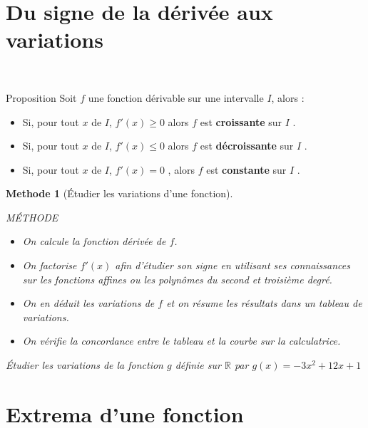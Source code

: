 \documentclass[10pt,a4paper]{article}
\def\R{{\mathbb R}}
\theoremstyle{break}
\newtheorem{Meth}{Methode}
\begin{document}
\section{Du signe de la dérivée aux variations}
~\\
\begin{bclogo}[couleur = yellow!30, arrondi = 0.1,logo=\bcbook]{Proposition}
	Soit $f$ une fonction dérivable sur une intervalle  $I$, alors :
		\begin{itemize}
		\item Si, pour tout $x$ de $I$, $f'(x)  \geq 0 $  alors $f$ est \textbf{ croissante} sur $I$ .
		\item Si, pour tout $x$ de $I$, $f'(x) \leq 0 $  alors $f$ est \textbf{ décroissante} sur $I$ .
		\item Si, pour tout $x$ de $I$, $f'(x) = 0 $ , alors $f$ est \textbf{ constante } sur $I$ .
	\end{itemize}  
	\end{bclogo}
\begin{Meth}[Étudier les variations d'une fonction]
	~\\
	\begin{bclogo}[couleur=green!30,arrondi=0.1,logo=\bcbook]{MÉTHODE}	
		\begin{itemize}
				\item On calcule la fonction dérivée de $f$.
		\item On factorise $f'(x)$ afin d'étudier son signe en utilisant ses connaissances sur les fonctions affines ou les polynômes du second et troisième degré.
		\item On en déduit les variations de $f$ et on résume les résultats dans un tableau de variations.
				\item On vérifie  la concordance entre le tableau et la courbe sur la calculatrice.
	\end{itemize}
\end{bclogo}
	Étudier les variations de la fonction $g$   définie sur $\R$ par $g (x) =-3x^2+12x+1$
\end{Meth}	
\section{Extrema d'une fonction}
\end{document}
